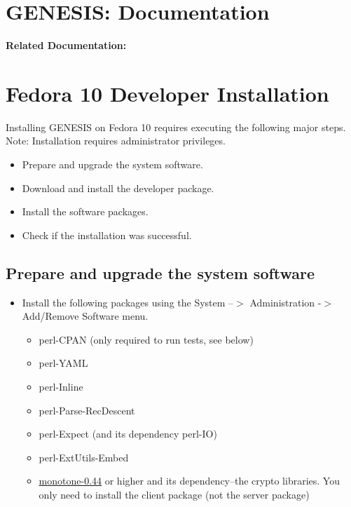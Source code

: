 \documentclass[12pt]{article}
\begin{document}
\section*{GENESIS: Documentation}

{\bf Related Documentation:}

\section*{Fedora 10 Developer Installation}

Installing GENESIS on Fedora 10 requires executing the following major steps. Note: Installation requires administrator privileges.
\begin{itemize}
   \item[] Prepare and upgrade the system software.
   \item[] Download and install the developer package.
   \item[] Install the software packages.
   \item[] Check if the installation was successful. 
\end{itemize}

\subsection*{Prepare and upgrade the system software}

\begin{itemize}
   \item[] Install the following packages using the System --$>$ Administration -$>$ Add/Remove Software menu.
      \begin{itemize}
         \item perl-CPAN (only required to run tests, see below)
         \item perl-YAML
         \item perl-Inline
         \item perl-Parse-RecDescent
         \item perl-Expect (and its dependency perl-IO)
         \item perl-ExtUtils-Embed
         \item \href{http://monotone.ca/}{monotone-0.44} or higher and its dependency--the crypto libraries. You only need to install the client package (not the server package) 
      \end{itemize}
 \end{itemize}
\end{document}
